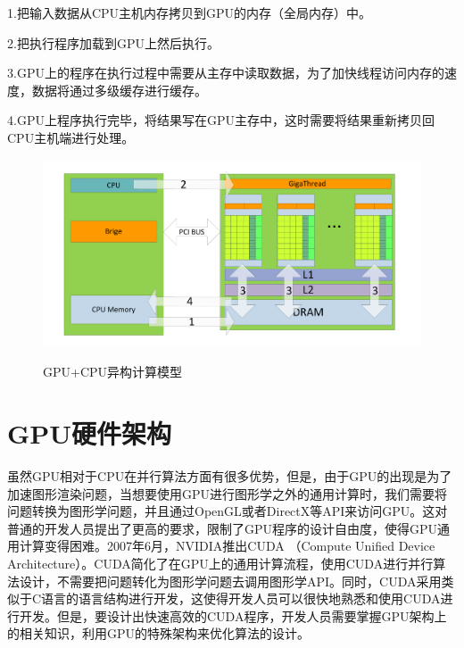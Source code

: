 1.把输入数据从CPU主机内存拷贝到GPU的内存（全局内存）中。

2.把执行程序加载到GPU上然后执行。

3.GPU上的程序在执行过程中需要从主存中读取数据，为了加快线程访问内存的速度，数据将通过多级缓存进行缓存。

4.GPU上程序执行完毕，将结果写在GPU主存中，这时需要将结果重新拷贝回CPU主机端进行处理。
\begin{figure}
\setlength{\abovecaptionskip}{-0.5cm}
\begin{center}
{\includegraphics[width=0.8 \textwidth]{figures/yigou.pdf}}
\end{center}
\caption{{\footnotesize{GPU+CPU异构计算模型}}}
\label{GCY}
\end{figure}
\section{GPU硬件架构}

虽然GPU相对于CPU在并行算法方面有很多优势，但是，由于GPU的出现是为了加速图形渲染问题，当想要使用GPU进行图形学之外的通用计算时，我们需要将问题转换为图形学问题，并且通过OpenGL或者DirectX等API来访问GPU。这对普通的开发人员提出了更高的要求，限制了GPU程序的设计自由度，使得GPU通用计算变得困难。2007年6月，NVIDIA推出CUDA （Compute Unified Device Architecture）。CUDA简化了在GPU上的通用计算流程，使用CUDA进行并行算法设计，不需要把问题转化为图形学问题去调用图形学API。同时，CUDA采用类似于C语言的语言结构进行开发，这使得开发人员可以很快地熟悉和使用CUDA进行开发。但是，要设计出快速高效的CUDA程序，开发人员需要掌握GPU架构上的相关知识，利用GPU的特殊架构来优化算法的设计。

